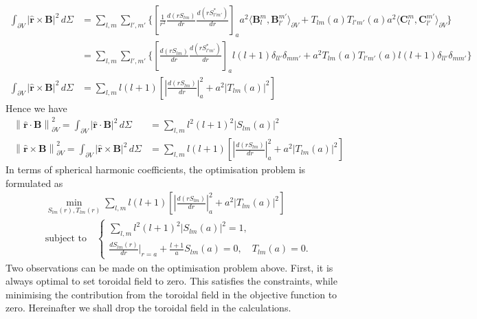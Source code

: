 \documentclass[a4paper, 11pt]{article}
\begin{document}
\[\begin{aligned}
    \int_{\partial V} |\hat{\mathbf{r}}\times \mathbf{B}|^2 \, d\Sigma &= \sum_{l,m} \sum_{l',m'} \bigg\{ \left[\frac{1}{r^2}\frac{d(rS_{lm})}{dr} \frac{d(rS_{l'm'}^*)}{dr}\right]_{a} a^2 \langle \mathbf{B}_l^m, \mathbf{B}_{l'}^{m'} \rangle_{\partial V} + T_{lm}(a) T_{l'm'}(a) a^2 \langle \mathbf{C}_l^m, \mathbf{C}_{l'}^{m'}\rangle_{\partial V} \bigg\} \\ 
    &= \sum_{l,m} \sum_{l',m'} \bigg\{ \left[\frac{d(rS_{lm})}{dr} \frac{d(rS_{l'm'}^*)}{dr}\right]_{a} l(l+1) \delta_{ll'}\delta_{mm'} + a^2 T_{lm}(a) T_{l'm'}(a) l(l+1) \delta_{ll'}\delta_{mm'} \bigg\} \\ 
    \int_{\partial V} |\hat{\mathbf{r}}\times \mathbf{B}|^2 \, d\Sigma &= \sum_{l,m} l(l+1) \left[\left|\frac{d(rS_{lm})}{dr}\right|_{a}^2 + a^2 |T_{lm}(a)|^2\right]
\end{aligned}\]
Hence we have
\begin{align}
    \left\|\hat{\mathbf{r}}\cdot \mathbf{B}\right\|^2_{\partial V} = \int_{\partial V} |\hat{\mathbf{r}}\cdot \mathbf{B}|^2 \, d\Sigma &= \sum_{l,m} l^2(l+1)^2 |S_{lm}(a)|^2 \\ 
    \left\|\hat{\mathbf{r}}\times \mathbf{B}\right\|^2_{\partial V} = \int_{\partial V} |\hat{\mathbf{r}}\times \mathbf{B}|^2 \, d\Sigma &= \sum_{l,m} l(l+1) \left[\left|\frac{d(rS_{lm})}{dr}\right|_{a}^2 + a^2 |T_{lm}(a)|^2\right]
\end{align}
In terms of spherical harmonic coefficients, the optimisation problem is formulated as
\[
    \begin{gathered}
        \min_{S_{lm}(r), T_{lm}(r)} \sum_{l,m} l(l+1) \left[\left|\frac{d(rS_{lm})}{dr}\right|_{a}^2 + a^2 |T_{lm}(a)|^2\right] \\ 
        \text{subject to} \quad \left\{\begin{aligned}
            \sum_{l,m} l^2(l+1)^2 |S_{lm}(a)|^2 = 1, \\ 
            \frac{dS_{lm}(r)}{dr} \bigg|_{r=a} + \frac{l+1}{a} S_{lm}(a) = 0,\quad T_{lm}(a) = 0.
        \end{aligned}\right.
    \end{gathered}
\]
Two observations can be made on the optimisation problem above. First, it is always optimal to set toroidal field to zero. This satisfies the constraints, while minimising the contribution from the toroidal field in the objective function to zero. Hereinafter we shall drop the toroidal field in the calculations. 
\end{document}
